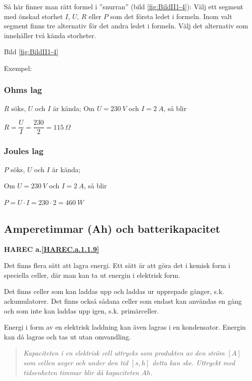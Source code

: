 Så här finner man rätt formel i ''snurran'' (bild \ref{fig:BildII1-4}):
Välj ett segment med önskad storhet \(I\), \(U\), \(R\) eller \(P\) som det första
ledet i formeln. Inom valt segment finns tre alternativ för det andra
ledet i formeln. Välj det alternativ som innehåller två kända storheter.

Bild \ref{fig:BildII1-4}

Exempel:

\subsubsection{Ohms lag}

\(R\) söks, \(U\) och \(I\) är kända;
Om \(U = 230\ V\) och \(I = 2\ A\), så blir

\(R=\dfrac{U}{I}=\dfrac{230}{2}=115\ \Omega\)

\subsubsection{Joules lag}

\(P\) söks, \(U\) och \(I\) är kända;

Om \(U = 230\ V\) och \(I = 2\ A\), så blir

\(P = U \cdot I = 230 \cdot 2 = 460\ W\)

\subsection{Amperetimmar (Ah) och batterikapacitet}
\textbf{HAREC a.\ref{HAREC.a.1.1.9}\label{myHAREC.a.1.1.9}}

Det finns flera sätt att lagra energi. Ett sätt är att göra det i kemisk form i
speciella celler, där man kan ta ut energin i elektrisk form.

Det finns celler som kan laddas upp och laddas ur upprepade gånger, s.k.
ackumulatorer.
Det finns också sådana celler som endast kan användas en gång och som inte
kan laddas upp igen, s.k. primärceller.

Energi i form av en elektrisk laddning kan även lagras i en kondensator.
Energin kan då lagras och tas ut utan omvandling.

\begin{quote}\emph{
Kapaciteten i en elektrisk cell uttrycks som produkten av den ström \([A]\) som
cellen avger och under den tid \([s, h]\) detta kan ske.
Uttryckt med tidsenheten timmar blir då kapaciteten \(Ah\).
}\end{quote}

